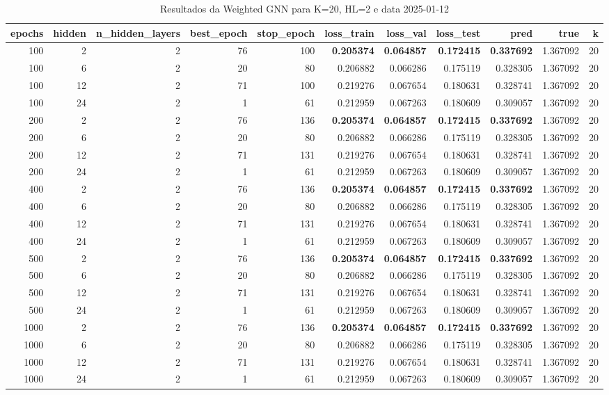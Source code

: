 \begin{table}
\caption{Resultados da Weighted GNN para K=20, HL=2 e data 2025-01-12}
\label{tab:weighted_gnn_results_k20_hl2_d20250112}
\begin{tabular}{rrrrrrrrrrr}
\toprule
epochs & hidden & n\_hidden\_layers & best\_epoch & stop\_epoch & loss\_train & loss\_val & loss\_test & pred & true & k \\
\midrule
100 & 2 & 2 & 76 & 100 & \textbf{0.205374} & \textbf{0.064857} & \textbf{0.172415} & \textbf{0.337692} & 1.367092 & 20 \\
100 & 6 & 2 & 20 & 80 & 0.206882 & 0.066286 & 0.175119 & 0.328305 & 1.367092 & 20 \\
100 & 12 & 2 & 71 & 100 & 0.219276 & 0.067654 & 0.180631 & 0.328741 & 1.367092 & 20 \\
100 & 24 & 2 & 1 & 61 & 0.212959 & 0.067263 & 0.180609 & 0.309057 & 1.367092 & 20 \\
200 & 2 & 2 & 76 & 136 & \textbf{0.205374} & \textbf{0.064857} & \textbf{0.172415} & \textbf{0.337692} & 1.367092 & 20 \\
200 & 6 & 2 & 20 & 80 & 0.206882 & 0.066286 & 0.175119 & 0.328305 & 1.367092 & 20 \\
200 & 12 & 2 & 71 & 131 & 0.219276 & 0.067654 & 0.180631 & 0.328741 & 1.367092 & 20 \\
200 & 24 & 2 & 1 & 61 & 0.212959 & 0.067263 & 0.180609 & 0.309057 & 1.367092 & 20 \\
400 & 2 & 2 & 76 & 136 & \textbf{0.205374} & \textbf{0.064857} & \textbf{0.172415} & \textbf{0.337692} & 1.367092 & 20 \\
400 & 6 & 2 & 20 & 80 & 0.206882 & 0.066286 & 0.175119 & 0.328305 & 1.367092 & 20 \\
400 & 12 & 2 & 71 & 131 & 0.219276 & 0.067654 & 0.180631 & 0.328741 & 1.367092 & 20 \\
400 & 24 & 2 & 1 & 61 & 0.212959 & 0.067263 & 0.180609 & 0.309057 & 1.367092 & 20 \\
500 & 2 & 2 & 76 & 136 & \textbf{0.205374} & \textbf{0.064857} & \textbf{0.172415} & \textbf{0.337692} & 1.367092 & 20 \\
500 & 6 & 2 & 20 & 80 & 0.206882 & 0.066286 & 0.175119 & 0.328305 & 1.367092 & 20 \\
500 & 12 & 2 & 71 & 131 & 0.219276 & 0.067654 & 0.180631 & 0.328741 & 1.367092 & 20 \\
500 & 24 & 2 & 1 & 61 & 0.212959 & 0.067263 & 0.180609 & 0.309057 & 1.367092 & 20 \\
1000 & 2 & 2 & 76 & 136 & \textbf{0.205374} & \textbf{0.064857} & \textbf{0.172415} & \textbf{0.337692} & 1.367092 & 20 \\
1000 & 6 & 2 & 20 & 80 & 0.206882 & 0.066286 & 0.175119 & 0.328305 & 1.367092 & 20 \\
1000 & 12 & 2 & 71 & 131 & 0.219276 & 0.067654 & 0.180631 & 0.328741 & 1.367092 & 20 \\
1000 & 24 & 2 & 1 & 61 & 0.212959 & 0.067263 & 0.180609 & 0.309057 & 1.367092 & 20 \\
\bottomrule
\end{tabular}
\end{table}

